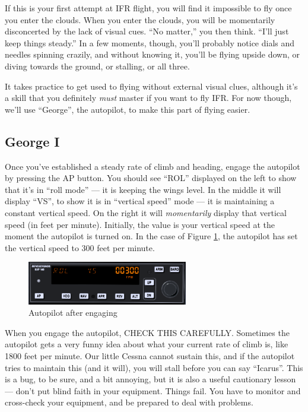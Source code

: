 If this is your first attempt at IFR flight, you will find it
impossible to fly once you enter the clouds.  When you enter the
clouds, you will be momentarily disconcerted by the lack of visual
cues.  ``No matter,'' you then think.  ``I'll just keep things
steady.''  In a few moments, though, you'll probably notice dials and
needles spinning crazily, and without knowing it, you'll be flying
upside down, or diving towards the ground, or stalling, or all three.

It takes practice to get used to flying without external visual clues,
although it's a skill that you definitely \emph{must} master if you
want to fly IFR.  For now though, we'll use ``George'', the autopilot,
to make this part of flying easier.

\subsection{George I}

Once you've established a steady rate of climb and heading, engage the
autopilot by pressing the AP button.  You should see ``ROL'' displayed
on the left to show that it's in ``roll mode'' --- it is keeping the
wings level.  In the middle it will display ``VS'', to show it is in
``vertical speed'' mode --- it is maintaining a constant vertical
speed.  On the right it will \emph{momentarily} display that vertical
speed (in feet per minute).  Initially, the value is your vertical
speed at the moment the autopilot is turned on.  In the case of Figure
\ref{fig:ap_vs}, the autopilot has set the vertical speed to 300 feet
per minute.

\begin{figure}
  \begin{center}
    \includegraphics[width=7cm]{img/ap_vs}
    \caption{Autopilot after engaging}
    \label{fig:ap_vs}
  \end{center}
\end{figure}


When you engage the autopilot, CHECK THIS CAREFULLY.  Sometimes the
autopilot gets a very funny idea about what your current rate of climb
is, like 1800 feet per minute.  Our little Cessna cannot sustain this,
and if the autopilot tries to maintain this (and it will), you will
stall before you can say ``Icarus''.  This is a bug, to be sure, and a
bit annoying, but it is also a useful cautionary lesson --- don't put
blind faith in your equipment.  Things fail.  You have to monitor and
cross-check your equipment, and be prepared to deal with problems.

